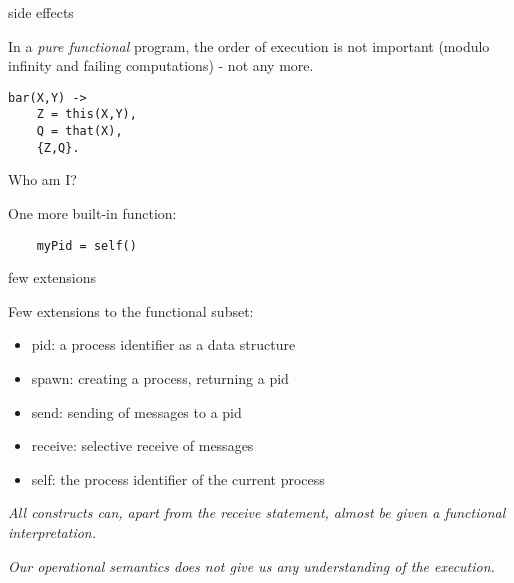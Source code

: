 \begin{frame}[fragile]{side effects}

  In a {\em pure functional} program, the order of execution is not
  important (modulo infinity and failing computations) \pause - not any more.

\pause\vspace{10pt}
\begin{verbatim}
bar(X,Y) ->
    Z = this(X,Y),
    Q = that(X),
    {Z,Q}.
\end{verbatim}


\end{frame}

 
\begin{frame}[fragile]{Who am I?}

One more built-in function:

\pause\vspace{10pt}

\begin{verbatim}
    myPid = self()
\end{verbatim}

\end{frame}

\begin{frame}{few extensions}

Few extensions to the functional subset:
\pause\vspace{10pt}
\begin{itemize}
\pause\item pid: a process identifier as a data structure
\pause\item spawn: creating a process, returning a pid
\pause\item send: sending of messages to a pid
\pause\item receive: selective receive of messages
\pause\item self: the process identifier of the current process
\end{itemize}

\pause\vspace{10pt}
{\em All constructs can, apart from the receive statement, almost be given a functional interpretation.}

\pause\vspace{10pt}
{\em Our operational semantics does not give us any understanding of the execution.}

\end{frame}

